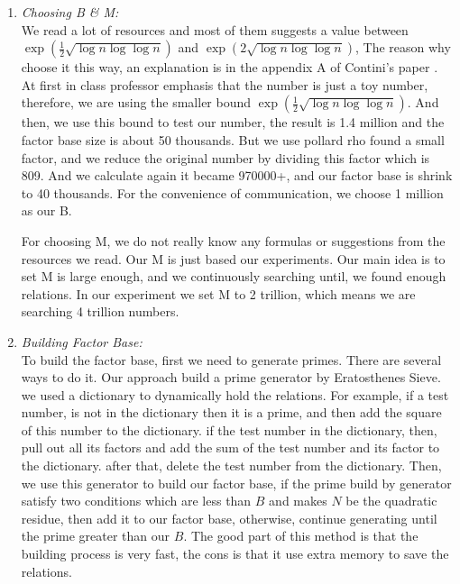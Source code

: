 \documentclass[12pt]{article} %
\begin{document}
\renewcommand\labelenumi{\Roman{enumi}}
\begin{enumerate}
\item \textit{Choosing B \& M:} \vspace{2mm}
\\ We read a lot of resources and most of them suggests a value between $\exp{(\frac{1}{2}\sqrt{\log{n}\log{\log{n}}})}$ and $\exp{(2\sqrt{\log{n}\log{\log{n}}})}$, The reason why choose it this way, an explanation is in the appendix A of Contini's paper \cite{contini}. At first in class professor emphasis that the number is just a toy number, therefore, we are using the smaller bound $\exp{(\frac{1}{2}\sqrt{\log{n}\log{\log{n}}})}$. And then, we use  this bound to test our number, the result is 1.4 million and the factor base size is about 50 thousands. But we use pollard rho found a small factor, and we reduce the original number by dividing this factor which is 809. And we calculate again it became 970000+, and our factor base is shrink to 40 thousands. For the convenience of communication, we choose 1 million as our B. 

For choosing M, we do not really know any formulas or suggestions from the resources we read. Our M is just based our experiments. Our main idea is to set M is large enough, and we continuously searching until, we found enough relations. In our experiment we set M to 2 trillion, which means we are searching 4 trillion numbers.

\item \textit{Building Factor Base:} \vspace{2mm}
\\ To build the factor base, first we need to generate primes. There are several ways to do it. Our approach build a prime generator by Eratosthenes Sieve. we used a dictionary to dynamically hold the relations. For example, if a test number, is not in the dictionary then it is a prime, and then add the square of this number to the dictionary. if the test number in the dictionary, then, pull out all its factors and add the sum of the test number and its factor to the dictionary. after that, delete the test number from the dictionary. Then, we use this generator to build our factor base, if the prime build by generator satisfy two conditions which are less than $B$ and makes $N$ be the quadratic residue, then add it to our factor base, otherwise, continue generating until the prime greater than our $B$. The good part of this method is that the building process is very fast, the cons is that it use extra memory to save the relations.


\end{enumerate}
\end{document}
